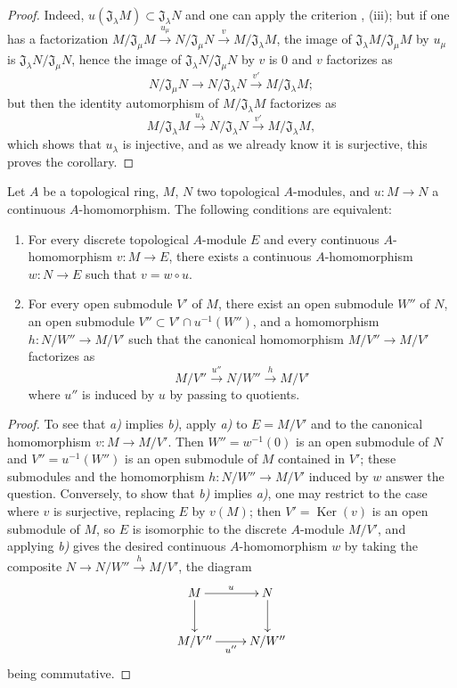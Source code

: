 \begin{proof}
Indeed, $u(\mathfrak{J}_\lambda M)\subset\mathfrak{J}_\lambda N$ and one can apply the criterion , (iii);
but if one has a factorization $M/\mathfrak{J}_\mu M\xrightarrow{u_\mu}N/\mathfrak{J}_\mu N\xrightarrow{v}M/\mathfrak{J}_\lambda M$, the image of $\mathfrak{J}_\lambda M/\mathfrak{J}_\mu M$ by $u_\mu$ is $\mathfrak{J}_\lambda N/\mathfrak{J}_\mu N$, hence the image of $\mathfrak{J}_\lambda N/\mathfrak{J}_\mu N$ by $v$ is $0$ and $v$ factorizes as
\[
  N/\mathfrak{J}_\mu N\to N/\mathfrak{J}_\lambda N\xrightarrow{v'}M/\mathfrak{J}_\lambda M;
\]
but then the identity automorphism of $M/\mathfrak{J}_\lambda M$ factorizes as
\[
  M/\mathfrak{J}_\lambda M\xrightarrow{u_\lambda}N/\mathfrak{J}_\lambda N\xrightarrow{v'}M/\mathfrak{J}_\lambda M,
\]
which shows that $u_\lambda$ is injective, and as we already know it is surjective, this proves the corollary.
\end{proof}

\begin{proposition}[19.1.5]
\label{0.19.1.5}
Let $A$ be a topological ring, $M$, $N$ two topological $A$-modules, and $u:M\to N$ a continuous $A$-homomorphism.
The following conditions are equivalent:
\begin{enumerate}
  \item[\textup{a)}] For every \textup{discrete} topological $A$-module $E$ and every continuous $A$-homomorphism $v:M\to E$, there exists a continuous $A$-homomorphism $w:N\to E$ such that $v=w\circ u$.
  \item[\textup{b)}] For every open submodule $V'$ of $M$, there exist an open submodule $W''$ of $N$, an open submodule $V''\subset V'\cap u^{-1}(W'')$, and a homomorphism $h:N/W''\to M/V'$ such that the canonical homomorphism $M/V''\to M/V'$ factorizes as
  \[
    M/V''\xrightarrow{u''}N/W''\xrightarrow{h}M/V'
  \]
  where $u''$ is induced by $u$ by passing to quotients.
\end{enumerate}
\end{proposition}

\begin{proof}
To see that \emph{a)} implies \emph{b)}, apply \emph{a)} to $E=M/V'$ and to the canonical homomorphism $v:M\to M/V'$.
Then $W''=w^{-1}(0)$ is an open submodule of $N$ and $V''=u^{-1}(W'')$ is an open submodule of $M$ contained in $V'$;
these submodules and the homomorphism $h:N/W''\to M/V'$ induced by $w$ answer the question.
Conversely, to show that \emph{b)} implies \emph{a)}, one may restrict to the case where $v$ is surjective, replacing $E$ by $v(M)$;
then $V'=\operatorname{Ker}(v)$ is an open submodule of $M$, so $E$ is isomorphic to the discrete $A$-module $M/V'$, and applying \emph{b)} gives
the desired continuous $A$-homomorphism $w$ by taking the composite $N\to N/W''\xrightarrow{h}M/V'$, the diagram
\[
  \xymatrix{
    M\ar[r]^u\ar[d] & N\ar[d]\\
    M/V''\ar[r]_{u''} & N/W''
  }
\]
being commutative.
\end{proof}

